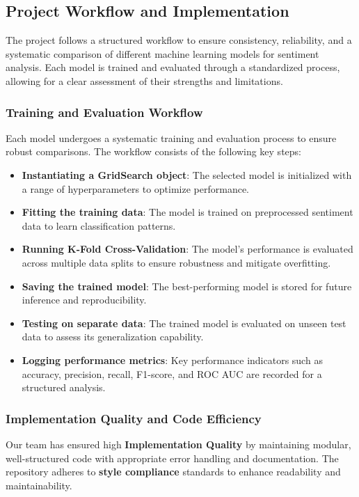 \subsection{Project Workflow and Implementation}

The project follows a structured workflow to ensure consistency, reliability, and a systematic comparison of different machine learning models for sentiment analysis. Each model is trained and evaluated through a standardized process, allowing for a clear assessment of their strengths and limitations.

\subsubsection{Training and Evaluation Workflow}

Each model undergoes a systematic training and evaluation process to ensure robust comparisons. The workflow consists of the following key steps:

\begin{itemize}
    \item \textbf{Instantiating a GridSearch object}: The selected model is initialized with a range of hyperparameters to optimize performance.
    \item \textbf{Fitting the training data}: The model is trained on preprocessed sentiment data to learn classification patterns.
    \item \textbf{Running K-Fold Cross-Validation}: The model’s performance is evaluated across multiple data splits to ensure robustness and mitigate overfitting.
    \item \textbf{Saving the trained model}: The best-performing model is stored for future inference and reproducibility.
    \item \textbf{Testing on separate data}: The trained model is evaluated on unseen test data to assess its generalization capability.
    \item \textbf{Logging performance metrics}: Key performance indicators such as accuracy, precision, recall, F1-score, and ROC AUC are recorded for a structured analysis.
\end{itemize}

\subsubsection{Implementation Quality and Code Efficiency}

Our team has ensured high \textbf{Implementation Quality} by maintaining modular, well-structured code with appropriate error handling and documentation. The repository adheres to \textbf{style compliance} standards to enhance readability and maintainability.

